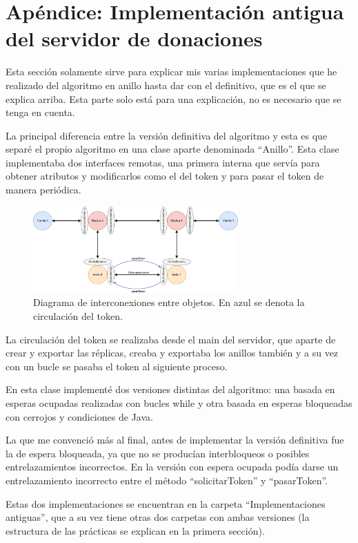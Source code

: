 \documentclass{article}
\begin{document}
\section{Apéndice: Implementación antigua del servidor de donaciones}
Esta sección solamente sirve para explicar mis varias implementaciones que he realizado del algoritmo en anillo hasta dar con el definitivo, que es el que se explica arriba. Esta parte solo está para una explicación, no es necesario que se tenga en cuenta.

La principal diferencia entre la versión definitiva del algoritmo y esta es que separé el propio algoritmo en una clase aparte denominada ``Anillo''. Esta clase implementaba dos interfaces remotas, una primera interna que servía para obtener atributos y modificarlos como el del token y para pasar el token de manera periódica.

\begin{figure}[H]
    \centering
    \includegraphics[width=0.7\textwidth]{imagenes/diagramaAnillosSeparados.png}
    \caption{Diagrama de interconexiones entre objetos. En azul se denota la circulación del token.}
\end{figure}

La circulación del token se realizaba desde el main del servidor, que aparte de crear y exportar las réplicas, creaba y exportaba los anillos también y a su vez con un bucle se pasaba el token al siguiente proceso.

En esta clase implementé dos versiones distintas del algoritmo: una basada en esperas ocupadas realizadas con bucles while y otra basada en esperas bloqueadas con cerrojos y condiciones de Java.

La que me convenció más al final, antes de implementar la versión definitiva fue la de espera bloqueada, ya que no se producían interbloqueos o posibles entrelazamientos incorrectos. En la versión con espera ocupada podía darse un entrelazamiento incorrecto entre el método ``solicitarToken'' y ``pasarToken''.

Estas dos implementaciones se encuentran en la carpeta ``Implementaciones antiguas'', que a su vez tiene otras dos carpetas con ambas versiones (la estructura de las prácticas se explican en la primera sección).
\end{document}
